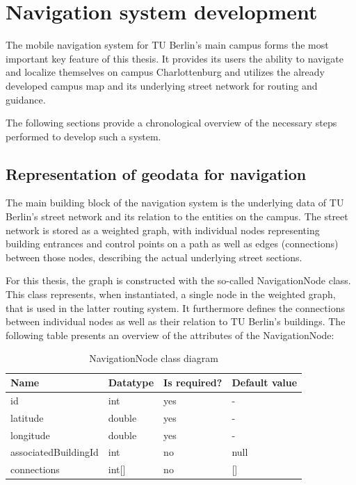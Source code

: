 \section{Navigation system development}
The mobile navigation system for TU Berlin's main campus forms the most important key feature of this thesis. It provides its users the ability to navigate and localize themselves on campus Charlottenburg and utilizes the already developed campus map and its underlying street network for routing and guidance.

The following sections provide a chronological overview of the necessary steps performed to develop such a system.

\subsection{Representation of geodata for navigation}
The main building block of the navigation system is the underlying data of TU Berlin's street network and its relation to the entities on the campus. The street network is stored as a weighted graph, with individual nodes representing building entrances and control points on a path as well as edges (connections) between those nodes, describing the actual underlying street sections.

For this thesis, the graph is constructed with the so-called NavigationNode class. This class represents, when instantiated, a single node in the weighted graph, that is used in the latter routing system. It furthermore defines the connections between individual nodes as well as their relation to TU Berlin's buildings. The following table presents an overview of the attributes of the NavigationNode:

\begin{table}[!ht]
	\small
	\centering
	\begin{tabular}{|l|l|l|l|}
		\hline
		\textbf{Name}           & \textbf{Datatype}     & \textbf{Is required?}       	& \textbf{Default value} 	\\
		\hline
        id               		& int	              	& yes                          	& - 				\\
		\hline
        latitude                & double              	& yes                          	& - 				\\
		\hline
		longitude               & double              	& yes                          	& - 				\\
		\hline
		associatedBuildingId    & int              		& no                          	& null 				\\
		\hline
		connections    			& int[]              	& no                          	& [] 				\\
		\hline
	\end{tabular}
	\caption{NavigationNode class diagram}
\end{table}


